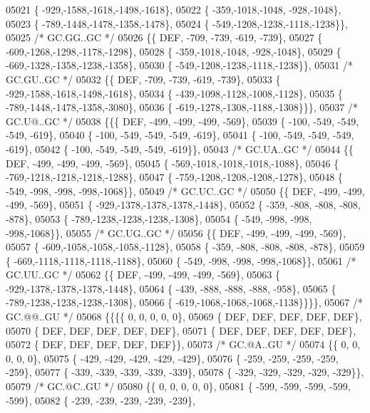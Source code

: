 \begin{DoxyCode}
05021 \{ -929,-1588,-1618,-1498,-1618\},
05022 \{ -359,-1018,-1048, -928,-1048\},
05023 \{ -789,-1448,-1478,-1358,-1478\},
05024 \{ -549,-1208,-1238,-1118,-1238\}\},
05025 \textcolor{comment}{/* GC.GG..GC */}
05026 \{\{  DEF, -709, -739, -619, -739\},
05027 \{ -609,-1268,-1298,-1178,-1298\},
05028 \{ -359,-1018,-1048, -928,-1048\},
05029 \{ -669,-1328,-1358,-1238,-1358\},
05030 \{ -549,-1208,-1238,-1118,-1238\}\},
05031 \textcolor{comment}{/* GC.GU..GC */}
05032 \{\{  DEF, -709, -739, -619, -739\},
05033 \{ -929,-1588,-1618,-1498,-1618\},
05034 \{ -439,-1098,-1128,-1008,-1128\},
05035 \{ -789,-1448,-1478,-1358,-3080\},
05036 \{ -619,-1278,-1308,-1188,-1308\}\}\},
05037 \textcolor{comment}{/* GC.U@..GC */}
05038 \{\{\{  DEF, -499, -499, -499, -569\},
05039 \{ -100, -549, -549, -549, -619\},
05040 \{ -100, -549, -549, -549, -619\},
05041 \{ -100, -549, -549, -549, -619\},
05042 \{ -100, -549, -549, -549, -619\}\},
05043 \textcolor{comment}{/* GC.UA..GC */}
05044 \{\{  DEF, -499, -499, -499, -569\},
05045 \{ -569,-1018,-1018,-1018,-1088\},
05046 \{ -769,-1218,-1218,-1218,-1288\},
05047 \{ -759,-1208,-1208,-1208,-1278\},
05048 \{ -549, -998, -998, -998,-1068\}\},
05049 \textcolor{comment}{/* GC.UC..GC */}
05050 \{\{  DEF, -499, -499, -499, -569\},
05051 \{ -929,-1378,-1378,-1378,-1448\},
05052 \{ -359, -808, -808, -808, -878\},
05053 \{ -789,-1238,-1238,-1238,-1308\},
05054 \{ -549, -998, -998, -998,-1068\}\},
05055 \textcolor{comment}{/* GC.UG..GC */}
05056 \{\{  DEF, -499, -499, -499, -569\},
05057 \{ -609,-1058,-1058,-1058,-1128\},
05058 \{ -359, -808, -808, -808, -878\},
05059 \{ -669,-1118,-1118,-1118,-1188\},
05060 \{ -549, -998, -998, -998,-1068\}\},
05061 \textcolor{comment}{/* GC.UU..GC */}
05062 \{\{  DEF, -499, -499, -499, -569\},
05063 \{ -929,-1378,-1378,-1378,-1448\},
05064 \{ -439, -888, -888, -888, -958\},
05065 \{ -789,-1238,-1238,-1238,-1308\},
05066 \{ -619,-1068,-1068,-1068,-1138\}\}\}\},
05067 \textcolor{comment}{/* GC.@@..GU */}
05068 \{\{\{\{    0,    0,    0,    0,    0\},
05069 \{  DEF,  DEF,  DEF,  DEF,  DEF\},
05070 \{  DEF,  DEF,  DEF,  DEF,  DEF\},
05071 \{  DEF,  DEF,  DEF,  DEF,  DEF\},
05072 \{  DEF,  DEF,  DEF,  DEF,  DEF\}\},
05073 \textcolor{comment}{/* GC.@A..GU */}
05074 \{\{    0,    0,    0,    0,    0\},
05075 \{ -429, -429, -429, -429, -429\},
05076 \{ -259, -259, -259, -259, -259\},
05077 \{ -339, -339, -339, -339, -339\},
05078 \{ -329, -329, -329, -329, -329\}\},
05079 \textcolor{comment}{/* GC.@C..GU */}
05080 \{\{    0,    0,    0,    0,    0\},
05081 \{ -599, -599, -599, -599, -599\},
05082 \{ -239, -239, -239, -239, -239\},

\end{DoxyCode}
